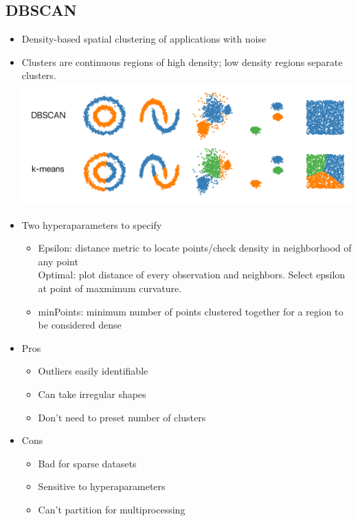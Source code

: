 \documentclass{article}
\begin{document}
\begin{multicols*}{3}
        \section{DBSCAN}
    \renewcommand\labelitemi{{\boldmath$\cdot$}}
    \begin{itemize}[noitemsep]
        \item Density-based spatial clustering of applications with noise
        \item Clusters are continuous regions of high density; low 
        density regions separate clusters. \\
        \includegraphics[width=\linewidth]{dbscan}
        \item Two hyperaparameters to specify
        \begin{itemize}
            \item Epsilon: distance metric to locate 
            points/check density in neighborhood of any point \\
            Optimal: plot distance of every observation and neighbors.
            Select epsilon at point of maxmimum curvature.
            \item minPoints: minimum number of points clustered together 
            for a region to be considered dense
        \end{itemize}
        \item Pros 
        \begin{itemize}
            \item Outliers easily identifiable
            \item Can take irregular shapes 
            \item Don't need to preset number of clusters
        \end{itemize}
        \item Cons
        \begin{itemize}
            \item Bad for sparse datasets
            \item Sensitive to hyperaparameters
            \item Can't partition for multiprocessing
        \end{itemize}
    \end{itemize}



\end{multicols*}
\end{document}
